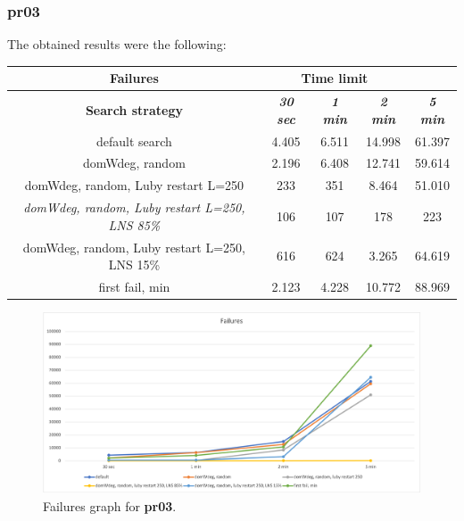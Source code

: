 \subsubsection{pr03}
\label{subsubsec:pr03}
The obtained results were the following:
{
\renewcommand{\arraystretch}{2}
\begin{longtable}[h]{| c | c | c | c | c |}
    \hline
    \textbf{Failures} & \multicolumn{3}{c}{\textbf{Time limit}} & \\
    \hline
    \textbf{Search strategy} & \textbf{\textit{30 sec}} & \textbf{\textit{1 min}} & \textbf{\textit{2 min}} & \textbf{\textit{5 min}} \\
    \hline
    \endhead
    default search                                         &  4.405 &  6.511 & 14.998 &  61.397 \\
    \hline
    domWdeg, random                                        &  2.196 &  6.408 & 12.741 &  59.614 \\
    \hline
    domWdeg, random, Luby restart L=250                    &   233 &   351 &  8.464 &  51.010 \\
    \hline
    \textit{domWdeg, random, Luby restart L=250, LNS 85\%} &   106 &   107 &   178 &    223 \\
    \hline
    domWdeg, random, Luby restart L=250, LNS 15\%          &   616 &   624 &  3.265 &  64.619 \\
    \hline
    first fail, min                                        &  2.123 &  4.228 & 10.772 &  88.969 \\
    \hline
\end{longtable}
}
\begin{figure}[H]
    \centering
    \includegraphics[width=0.8\columnwidth]{../graphs/pr03-failures.png}
    \caption{Failures graph for \textbf{pr03}.}
\end{figure}

